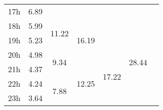 \begin{center}
\begin{tabular}{| l || c | c | c | c | c | c |}
17h & \multirow{1}{*}{ 6.89 }  & & & & & \\\cline{2-2}\cline{3-3}\cline{4-4}\cline{6-6}
18h & \multirow{1}{*}{ 5.99 }  & \multirow{2}{*}{ 11.22 }  & \multirow{3}{*}{ 16.19 }  & & \multirow{6}{*}{ 28.44 }  & \\\cline{2-2}
19h & \multirow{1}{*}{ 5.23 }  & & & & & \\\cline{2-2}\cline{3-3}\cline{5-5}
20h & \multirow{1}{*}{ 4.98 }  & \multirow{2}{*}{ 9.34 }  & & \multirow{4}{*}{ 17.22 }  & & \\\cline{2-2}\cline{4-4}
21h & \multirow{1}{*}{ 4.37 }  & & \multirow{3}{*}{ 12.25 }  & & & \\\cline{2-2}\cline{3-3}
22h & \multirow{1}{*}{ 4.24 }  & \multirow{2}{*}{ 7.88 }  & & & & \\\cline{2-2}
23h & \multirow{1}{*}{ 3.64 }  & & & & & \\\cline{2-2}\cline{3-3}\cline{4-4}\cline{5-5}\cline{6-6}\cline{7-7}
\hline\end{tabular}
\end{center}
